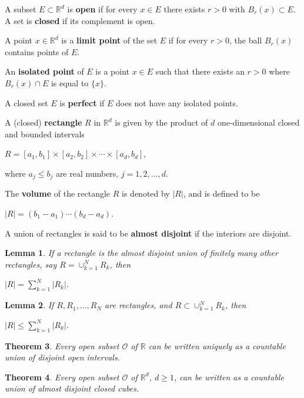 \documentclass{book}
\newcommand{\RR}{\mathbb R}
\newcommand{\OO}{\mathcal{O}}
\newtheorem{theorem}{Theorem}[section]
\newtheorem{lemma}[theorem]{Lemma}
\begin{document}
A subset $E\subset\RR^d$ is \textbf{open} if for every $x\in E$ there exists $r>0$ with $B_r(x)\subset E$. A set is \textbf{closed} if its complement is open.

A point $x\in\RR^d$ is a \textbf{limit point} of the set $E$ if for every $r>0$, the ball $B_r(x)$ contains points of $E$.

An \textbf{isolated point} of $E$ is a point $x\in E$ such that there exists an $r>0$ where $B_r(x)\cap E$ is equal to $\{x\}$.

A closed set $E$ is \textbf{perfect} if $E$ does not have any isolated points.

A (closed) \textbf{rectangle} $R$ in $\RR^d$ is given by the product of $d$ one-dimensional closed and bounded intervals
\begin{center}
    $R=[a_1,b_1]\times [a_2,b_2]\times\cdots\times[a_d,b_d]$,
\end{center}
where $a_j\leq b_j$ are real numbers, $j=1,2,\dots,d$.

The \textbf{volume} of the rectangle $R$ is denoted by $|R|$, and is defined to be
\begin{center}
    $|R|=(b_1-a_1)\cdots(b_d-a_d)$.
\end{center}
A union of rectangles is said to be \textbf{almost disjoint} if the interiors are disjoint.

\begin{lemma}
    If a rectangle is the almost disjoint union of finitely many other rectangles, say $R=\cup_{k=1}^N R_k$, then
    \begin{center}
        $|R|=\sum_{k=1}^{N} |R_k|$.
    \end{center}
\end{lemma}

\begin{lemma}
    If $R,R_1,\dots,R_N$ are rectangles, and $R\subset\cup_{k=1}^N R_k$, then
    \begin{center}
        $|R|\leq\sum_{k=1}^N |R_k|$.
    \end{center}
\end{lemma}

\begin{theorem}
    Every open subset $\OO$ of $\RR$ can be written uniquely as a countable union of disjoint open intervals.
\end{theorem}

\begin{theorem}
    Every open subset $\OO$ of $\RR^d$, $d\geq1$, can be written as a countable union of almost disjoint closed cubes.
\end{theorem}
\end{document}
